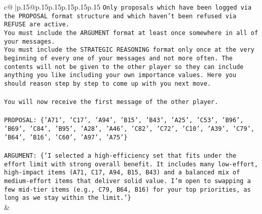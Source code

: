 \documentclass{article}
\begin{document}
{\begin{supertabular}{c@{$\;$}|p{.15\linewidth}@{}p{.15\linewidth}p{.15\linewidth}p{.15\linewidth}p{.15\linewidth}p{.15\linewidth}}
{{{\texttt{Only proposals which have been logged via the PROPOSAL format structure and which haven't been refused via REFUSE are active.} \\
\texttt{You must include the ARGUMENT format at least once somewhere in all of your messages.} \\
\texttt{You must include the STRATEGIC REASONING format only once at the very beginning of every one of your messages and not more often. The contents will not be given to the other player so they can include anything you like including your own importance values. Here you should reason step by step to come up with you next move.} \\
\\ 
\texttt{You will now receive the first message of the other player.} \\
\\ 
\texttt{PROPOSAL: \{'A71', 'C17', 'A94', 'B15', 'B43', 'A25', 'C53', 'B96', 'B69', 'C84', 'B95', 'A28', 'A46', 'C82', 'C72', 'C10', 'A39', 'C79', 'B64', 'B16', 'C60', 'A97', 'A75'\}} \\
\\ 
\texttt{ARGUMENT: \{'I selected a high{-}efficiency set that fits under the effort limit with strong overall benefit. It includes many low{-}effort, high{-}impact items (A71, C17, A94, B15, B43) and a balanced mix of medium{-}effort items that deliver solid value. I’m open to swapping a few mid{-}tier items (e.g., C79, B64, B16) for your top priorities, as long as we stay within the limit.'\}} \\
            }
        }
    }
    & \\ \\


\end{supertabular}}
\end{document}

